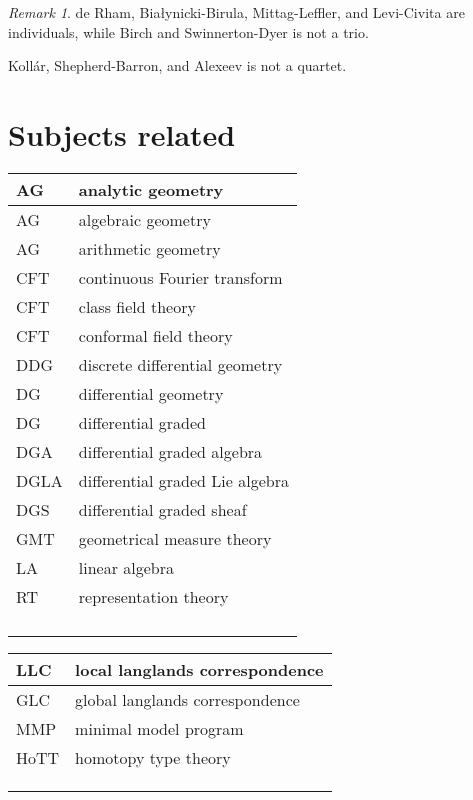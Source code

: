 \documentclass{amsart}
\numberwithin{equation}{section}
\theoremstyle{plain}
\numberwithin{equation}{section}
\theoremstyle{remark}
\newtheorem{remark}[theorem]{Remark}
\begin{document}
\begin{remark}
de Rham, Bia\l{}ynicki-Birula, Mittag-Leffler, and Levi-Civita are individuals, while Birch and Swinnerton-Dyer is not a trio.

Koll\'{a}r, Shepherd-Barron, and Alexeev is not a quartet.
\end{remark}


\section{Subjects related}

\begin{longtable}{l|l}
\hline
AG & analytic geometry \\ \hline
AG & algebraic geometry \\ \hline
AG & arithmetic geometry \\ \hline
CFT  & continuous Fourier transform\\ \hline
CFT & class field theory\\ \hline
CFT & conformal field theory\\ \hline
DDG & discrete differential geometry\\ \hline
DG & differential geometry\\ \hline
DG & differential graded\\ \hline
DGA & differential graded algebra\\ \hline
DGLA & differential graded Lie algebra\\ \hline
DGS & differential graded sheaf\\ \hline
GMT  & geometrical measure theory\\ \hline
LA & linear algebra  \\ \hline
RT & representation theory\\ \hline
 & \\ \hline
 & \\ \hline
 & \\ \hline
 & \\ \hline
\end{longtable}

\begin{longtable}{l|l}
\hline
LLC & local langlands correspondence \\ \hline
GLC & global langlands correspondence  \\ \hline
MMP & minimal model program\\ \hline
HoTT & homotopy type theory\\ \hline
 & \\ \hline
 & \\ \hline
 & \\ \hline
\end{longtable}
\end{document}
